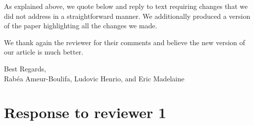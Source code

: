 \documentclass[10pt]{article}
\begin{document}
As explained above, we quote below and reply to text requiring changes that we did not  address in a straightforward manner. We additionally produced a version of the paper highlighting all the changes we made.

We thank again the reviewer for their comments and believe the new version of our article  is much better.

\begin{flushright}
  Best Regards,\\
  Rab\'ea Ameur-Boulifa, Ludovic Henrio, and Eric Madelaine
\end{flushright}

\newpage

\section*{Response to reviewer 1}
\end{document}
